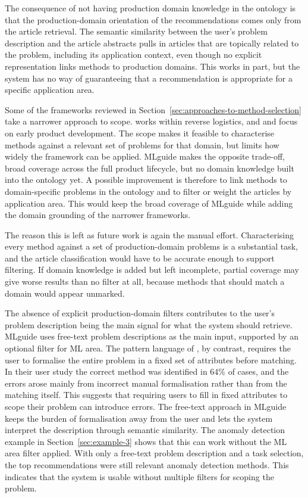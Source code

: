 The consequence of not having production domain knowledge in the ontology
is that the production-domain orientation of 
the recommendations comes only from the article retrieval. 
The semantic similarity between 
the user's problem description and the article abstracts 
pulls in articles that are topically related to the problem, 
including its application context, even though no explicit 
representation links methods to production domains. This works 
in part, but the system has no way of guaranteeing that a 
recommendation is appropriate for a specific application area.

Some of the frameworks reviewed in 
Section~\ref{sec:approaches-to-method-selection} take a narrower 
approach to scope.
\textcite{lickert2021_ml_selection_reverse_logistics} works 
within reverse logistics, and 
\textcite{sonntag2023pattern_ml_product_development} and \textcite{sonntag2024_mcda_framework} 
focus on early product development. The scope makes it 
feasible to characterise methods against a relevant set of 
problems for that domain, but limits how widely the framework 
can be applied. MLguide makes the opposite trade-off, broad 
coverage across the full product lifecycle, but no domain 
knowledge built into the ontology yet. A possible improvement is 
therefore to link methods to 
domain-specific problems in the ontology and to filter or weight the 
articles by application area. This would keep the broad coverage of 
MLguide while adding the domain grounding of the narrower frameworks.

The reason this is left as future work is again the manual 
effort. Characterising every method against a set of 
production-domain problems is a substantial task, and the 
article classification would have to be accurate enough to 
support filtering. If domain knowledge is added but left 
incomplete, partial coverage may give worse results than no 
filter at all, because methods that should match a domain 
would appear unmarked.

The absence of explicit production-domain filters contributes to 
the user's problem description being the main signal 
for what the system should retrieve. MLguide 
uses free-text problem 
descriptions as the main input, supported by an 
optional filter for ML area.
The pattern language of 
\textcite{sonntag2023pattern_ml_product_development}, by 
contrast, requires the user to formalise the entire problem 
in a fixed set of attributes before matching. In their user 
study the correct method was identified in 64\% of 
cases, and the errors arose mainly from incorrect manual 
formalisation rather than from the matching itself. This 
suggests that requiring users to fill in fixed attributes to 
scope their problem can introduce errors. The free-text 
approach in MLguide keeps the burden of formalisation away 
from the user and lets the system interpret the description 
through semantic similarity. The anomaly detection example in 
Section~\ref{sec:example-3} shows that this can work without 
the ML area filter applied. With only a free-text problem 
description and a task selection, the top recommendations 
were still relevant anomaly detection methods. This indicates 
that the system is usable without multiple filters
for scoping the problem.

